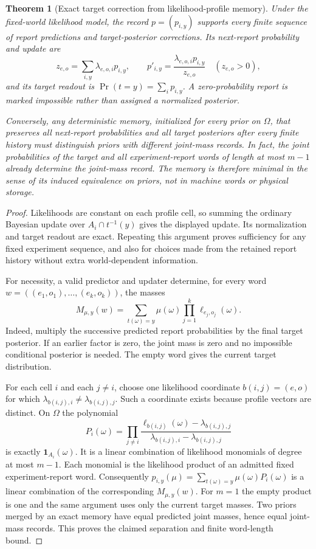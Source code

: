 \documentclass[11pt,letterpaper]{article}
\theoremstyle{plain}
\newtheorem{theorem}{Theorem}[section]
\theoremstyle{definition}
\begin{document}
\begin{theorem}[Exact target correction from likelihood-profile memory]\label{thm:likelihoodmemory}
Under the fixed-world likelihood model, the record $p=(p_{i,y})$ supports every finite sequence of report predictions and target-posterior corrections. Its next-report probability and update are
\[
z_{e,o}=\sum_{i,y}\lambda_{e,o,i}p_{i,y},\qquad
p'_{i,y}=\frac{\lambda_{e,o,i}p_{i,y}}{z_{e,o}}\quad(z_{e,o}>0),
\]
and its target readout is $\Pr(t=y)=\sum_i p_{i,y}$. A zero-probability report is marked impossible rather than assigned a normalized posterior.

Conversely, any deterministic memory, initialized for every prior on $\Omega$, that preserves all next-report probabilities and all target posteriors after every finite history must distinguish priors with different joint-mass records. In fact, the joint probabilities of the target and all experiment-report words of length at most $m-1$ already determine the joint-mass record. The memory is therefore minimal in the sense of its induced equivalence on priors, not in machine words or physical storage.
\end{theorem}
\begin{proof}
Likelihoods are constant on each profile cell, so summing the ordinary Bayesian update over $A_i\cap t^{-1}(y)$ gives the displayed update. Its normalization and target readout are exact. Repeating this argument proves sufficiency for any fixed experiment sequence, and also for choices made from the retained report history without extra world-dependent information.

For necessity, a valid predictor and updater determine, for every word $w=((e_1,o_1),\ldots,(e_k,o_k))$, the masses
\[
M_{\mu,y}(w)=\sum_{t(\omega)=y}\mu(\omega)
                  \prod_{j=1}^k\ell_{e_j,o_j}(\omega).
\]
Indeed, multiply the successive predicted report probabilities by the final target posterior. If an earlier factor is zero, the joint mass is zero and no impossible conditional posterior is needed. The empty word gives the current target distribution.

For each cell $i$ and each $j\ne i$, choose one likelihood coordinate $b(i,j)=(e,o)$ for which $\lambda_{b(i,j),i}\ne\lambda_{b(i,j),j}$. Such a coordinate exists because profile vectors are distinct. On $\Omega$ the polynomial
\[
P_i(\omega)=\prod_{j\ne i}
\frac{\ell_{b(i,j)}(\omega)-\lambda_{b(i,j),j}}
     {\lambda_{b(i,j),i}-\lambda_{b(i,j),j}}
\]
is exactly $\mathbf1_{A_i}(\omega)$. It is a linear combination of likelihood monomials of degree at most $m-1$. Each monomial is the likelihood product of an admitted fixed experiment-report word. Consequently $p_{i,y}(\mu)=\sum_{t(\omega)=y}\mu(\omega)P_i(\omega)$ is a linear combination of the corresponding $M_{\mu,y}(w)$. For $m=1$ the empty product is one and the same argument uses only the current target masses. Two priors merged by an exact memory have equal predicted joint masses, hence equal joint-mass records. This proves the claimed separation and finite word-length bound.
\end{proof}
\end{document}
